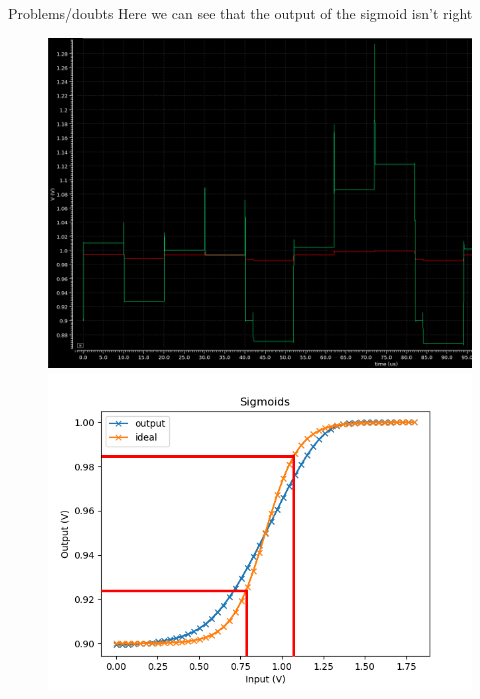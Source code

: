 \documentclass[table]{beamer}
\begin{document}
\begin{frame}{Problems/doubts}
  Here we can see that the output of the sigmoid isn't right
  \begin{figure}[!tbp]
    \centering
    \begin{minipage}[b]{0.4\textwidth}
      \centering
      \includegraphics[width=\textwidth]{fulltrial1/sigmoid-prob.png}
    \end{minipage}
    \hspace{20pt}
    \begin{minipage}[b]{0.4\textwidth}
      \centering
      \includegraphics[width=\textwidth]{activation/sigmoid-prob}
    \end{minipage}
  \end{figure}
\end{frame}
\end{document}
